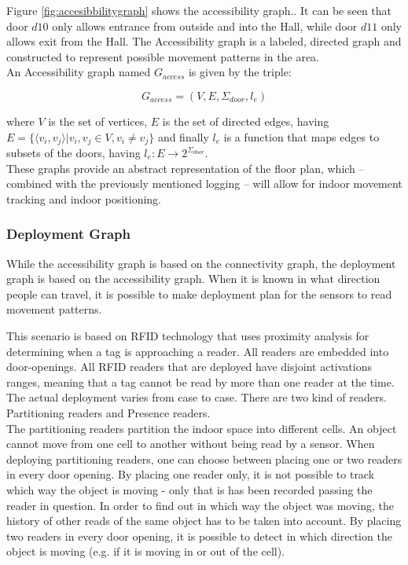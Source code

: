 Figure \ref{fig:accesibbilitygraph} shows the accessibility graph..
It can be seen that door $d10$ only allows entrance from outside and into the Hall, while door $d11$ only allows exit from the Hall.
The Accessibility graph is a labeled, directed graph and constructed to represent possible movement patterns in the area. \\

An Accessibility graph named $G_{access}$ is given by the triple: 

\begin{equation}
G_{access} = (V, E, \Sigma_{door}, l_e)
\end{equation} 

where $V$ is the set of vertices, $E$ is the set of directed edges, having $E = \{\langle v_i, v_j \rangle | v_i, v_j \in V,  v_i \not= v_j\}$ and finally $l_e$ is a function that maps edges to subsets of the doors, having $l_e : E \rightarrow 2^{\Sigma_{door}}$. \\

These graphs provide an abstract representation of the floor plan, which -- combined with the previously mentioned logging -- will allow for indoor movement tracking and indoor positioning. 

\subsubsection{ \quad Deployment Graph}
While the accessibility graph is based on the connectivity graph, the deployment graph is based on the accessibility graph. 
When it is known in what direction people can travel, it is possible to make deployment plan for the sensors to read movement patterns. 

This scenario is based on RFID technology that uses proximity analysis for determining when a tag is approaching a reader. 
All readers are embedded into door-openings. 
All RFID readers that are deployed have disjoint activations ranges, meaning that a tag cannot be read by more than one reader at the time. \\

The actual deployment varies from case to case. 
There are two kind of readers. Partitioning readers and Presence readers. \\

The partitioning readers partition the indoor space into different cells. 
An object cannot move from one cell to another without being read by a sensor. 
When deploying partitioning readers, one can choose between placing one or two readers in every door opening. 
By placing one reader only, it is not possible to track which way the object is moving - only that is has been recorded passing the reader in question. 
In order to find out in which way the object was moving, the history of other reads of the same object has to be taken into account. 
By placing two readers in every door opening, it is possible to detect in which direction the object is moving (e.g. if it is moving in or out of the cell). \\

